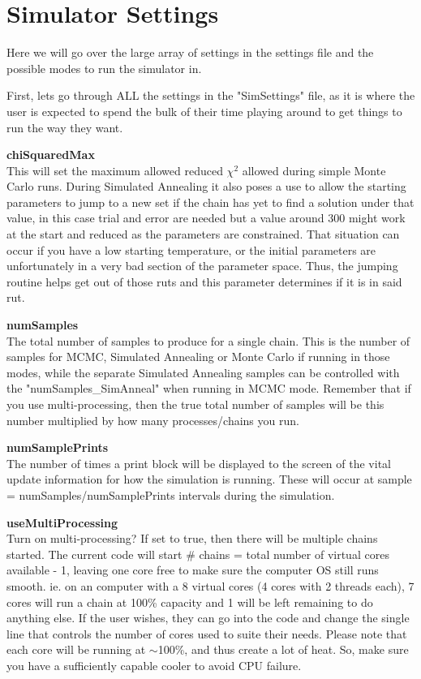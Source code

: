 \documentclass[12pt,preprint]{aastex}
\begin{document}
\pagebreak


\section{Simulator Settings}

Here we will go over the large array of settings in the settings file and the possible modes to run the simulator in.

First, lets go through ALL the settings in the "SimSettings" file, as it is where the user is expected to spend the bulk of their time playing around to get things to run the way they want.

{\bf chiSquaredMax}\\
This will set the maximum allowed reduced $\chi^2$ allowed during simple Monte Carlo runs.  During Simulated Annealing it also poses a use to allow the starting parameters to jump to a new set if the chain has yet to find a solution under that value, in this case trial and error are needed but a value around 300 might work at the start and reduced as the parameters are constrained.  That situation can occur if you have a low starting temperature, or the initial parameters are unfortunately in a very bad section of the parameter space.  Thus, the jumping routine helps get out of those ruts and this parameter determines if it is in said rut.

{\bf numSamples}\\
The total number of samples to produce for a single chain.  This is the number of samples for MCMC, Simulated Annealing or Monte Carlo if running in those modes, while the separate Simulated Annealing samples can be controlled with the "numSamples\_SimAnneal" when running in MCMC mode.  Remember that if you use multi-processing, then the true total number of samples will be this number multiplied by how many processes/chains you run.

{\bf numSamplePrints}\\
The number of times a print block will be displayed to the screen of the vital update information for how the simulation is running.  These will occur at sample = numSamples/numSamplePrints intervals during the simulation.

{\bf useMultiProcessing}\\
Turn on multi-processing?  If set to true, then there will be multiple chains started.  The current code will start \# chains = total number of virtual cores available - 1, leaving one core free to make sure the computer OS still runs smooth. ie. on an computer with a 8 virtual cores (4 cores with 2 threads each), 7 cores will run a chain at 100\% capacity and 1 will be left remaining to do anything else.  If the user wishes, they can go into the code and change the single line that controls the number of cores used to suite their needs.  Please note that each core will be running at $\sim$100\%, and thus create a lot of heat.  So, make sure you have a sufficiently capable cooler to avoid CPU failure.
\end{document}
